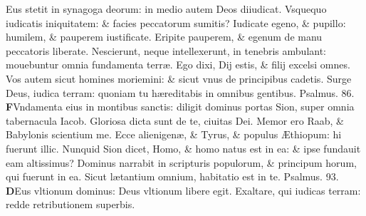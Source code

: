 \documentclass[a5paper,10pt]{book}
\def\ae{æ}
\def\AE{Æ}
\begin{document}
\begin{multicols*}{2}
Eus stetit in synagoga deorum: in medio autem Deos diiudicat.
\newline \color{red} V\color{black}squequo iudicatis iniquitatem: \& facies peccatorum sumitis?
\newline \color{red} I\color{black}udicate egeno, \& pupillo: humilem, \& pauperem iustificate.
\newline \color{red} E\color{black}ripite pauperem, \& egenum de manu peccatoris liberate.
\newline \color{red} N\color{black}escierunt, neque intellexerunt, in tenebris ambulant: mouebuntur omnia fundamenta terr\ae .
\newline \color{red} E\color{black}go dixi, Dij estis, \& filij excelsi omnes.
\newline \color{red} V\color{black}os autem sicut homines moriemini: \& sicut vnus de principibus cadetis.
\newline \color{red} S\color{black}urge Deus, iudica terram: quoniam tu h\ae reditabis in omnibus gentibus.
\newline \color{red} Psalmus. \hypertarget{ps86}{86.} \color{black}
\vspace{-.25em}
\lettrine[lines=2]{\bfseries \color{red} F}{}Vndamenta eius in montibus sanctis: diligit dominus portas Sion, super omnia tabernacula Iacob.
\newline \color{red} G\color{black}loriosa dicta sunt de te, ciuitas Dei.
\newline \color{red} M\color{black}emor ero Raab, \& Babylonis scientium me.%
\newline \color{red} E\color{black}cce alienigen\ae , \& Tyrus, \& populus \AE thiopum: hi fuerunt illic.
\newline \color{red} N\color{black}unquid Sion dicet, Homo, \& homo natus est in ea: \& ipse fundauit eam altissimus?
\newline \color{red} D\color{black}ominus narrabit in scripturis populorum, \& principum horum, qui fuerunt in ea.
\newline \color{red} S\color{black}icut l\ae tantium omnium, habitatio est in te. \quad \color{red} Psalmus. \hypertarget{ps93}{93.} \color{black}
\vspace{-.25em}
\lettrine[lines=2]{\bfseries \color{red} D}{}Eus vltionum dominus: Deus vltionum libere egit.
\newline \color{red} E\color{black}xaltare, qui iudicas terram: redde retributionem superbis.

\end{multicols*}
\end{document}

